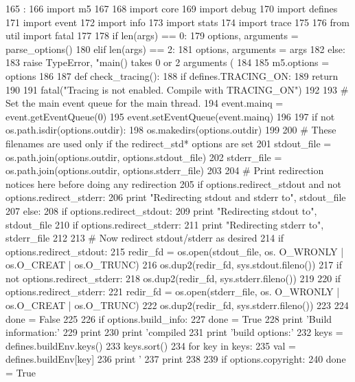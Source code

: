 \begin{DoxyCode}
165                :
166     import m5
167 
168     import core
169     import debug
170     import defines
171     import event
172     import info
173     import stats
174     import trace
175 
176     from util import fatal
177 
178     if len(args) == 0:
179         options, arguments = parse_options()
180     elif len(args) == 2:
181         options, arguments = args
182     else:
183         raise TypeError, "main() takes 0 or 2 arguments (%
184 
185     m5.options = options
186 
187     def check_tracing():
188         if defines.TRACING_ON:
189             return
190 
191         fatal("Tracing is not enabled.  Compile with TRACING_ON")
192 
193     # Set the main event queue for the main thread.
194     event.mainq = event.getEventQueue(0)
195     event.setEventQueue(event.mainq)
196 
197     if not os.path.isdir(options.outdir):
198         os.makedirs(options.outdir)
199 
200     # These filenames are used only if the redirect_std* options are set
201     stdout_file = os.path.join(options.outdir, options.stdout_file)
202     stderr_file = os.path.join(options.outdir, options.stderr_file)
203 
204     # Print redirection notices here before doing any redirection
205     if options.redirect_stdout and not options.redirect_stderr:
206         print "Redirecting stdout and stderr to", stdout_file
207     else:
208         if options.redirect_stdout:
209             print "Redirecting stdout to", stdout_file
210         if options.redirect_stderr:
211             print "Redirecting stderr to", stderr_file
212 
213     # Now redirect stdout/stderr as desired
214     if options.redirect_stdout:
215         redir_fd = os.open(stdout_file, os. O_WRONLY | os.O_CREAT | os.O_TRUNC)
216         os.dup2(redir_fd, sys.stdout.fileno())
217         if not options.redirect_stderr:
218             os.dup2(redir_fd, sys.stderr.fileno())
219 
220     if options.redirect_stderr:
221         redir_fd = os.open(stderr_file, os. O_WRONLY | os.O_CREAT | os.O_TRUNC)
222         os.dup2(redir_fd, sys.stderr.fileno())
223 
224     done = False
225 
226     if options.build_info:
227         done = True
228         print 'Build information:'
229         print
230         print 'compiled %
231         print 'build options:'
232         keys = defines.buildEnv.keys()
233         keys.sort()
234         for key in keys:
235             val = defines.buildEnv[key]
236             print '    %
237         print
238 
239     if options.copyright:
240         done = True

\end{DoxyCode}
